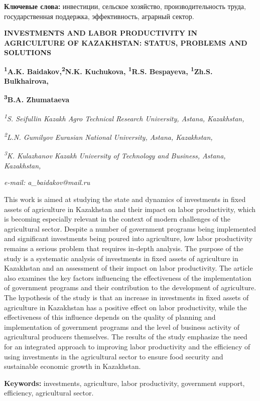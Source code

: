{{{\bfseries Ключевые слова:} инвестиции, сельское хозяйство,
производительность труда, государственная поддержка, эффективность,
аграрный сектор.

{\bfseries INVESTMENTS AND LABOR PRODUCTIVITY IN AGRICULTURE OF KAZAKHSTAN:
STATUS, PROBLEMS AND SOLUTIONS}

{\bfseries \textsuperscript{1}A.K.
Baidakov\textsuperscript{\envelope },\textsuperscript{2}N.K. Kuchukova,
\textsuperscript{1}R.S. Bespayeva, \textsuperscript{1}Zh.S.
Bulkhairova,}

{\bfseries \textsuperscript{3}B.A. Zhumataeva}

\emph{\textsuperscript{1}S. Seifullin Kazakh Agro Technical Research
University, Astana, Kazakhstan,}

\emph{\textsuperscript{2}L.N. Gumilyov Eurasian National University,
Astana, Kazakhstan,}

\emph{\textsuperscript{3}K. Kulazhanov Kazakh University of Technology
and Business, Astana, Kazakhstan,}

\emph{e-mail: a\_baidakov@mail.ru}

This work is aimed at studying the state and dynamics of investments in
fixed assets of agriculture in Kazakhstan and their impact on labor
productivity, which is becoming especially relevant in the context of
modern challenges of the agricultural sector. Despite a number of
government programs being implemented and significant investments being
poured into agriculture, low labor productivity remains a serious
problem that requires in-depth analysis. The purpose of the study is a
systematic analysis of investments in fixed assets of agriculture in
Kazakhstan and an assessment of their impact on labor productivity. The
article also examines the key factors influencing the effectiveness of
the implementation of government programs and their contribution to the
development of agriculture. The hypothesis of the study is that an
increase in investments in fixed assets of agriculture in Kazakhstan has
a positive effect on labor productivity, while the effectiveness of this
influence depends on the quality of planning and implementation of
government programs and the level of business activity of agricultural
producers themselves. The results of the study emphasize the need for an
integrated approach to improving labor productivity and the efficiency
of using investments in the agricultural sector to ensure food security
and sustainable economic growth in Kazakhstan.

{\bfseries Keywords:} investments, agriculture, labor productivity,
government support, efficiency, agricultural sector.

}}
